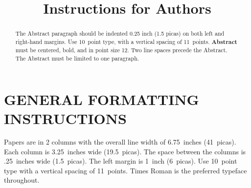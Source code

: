 

\title{Instructions for Authors}

\author{} %

%



\maketitle

\begin{abstract}
The Abstract paragraph should be indented 0.25 inch (1.5 picas) on
both left and right-hand margins.  Use 10~point type, with a vertical
spacing of 11~points.  {\bf Abstract} must be centered, bold, and in
point size 12. Two line spaces precede the Abstract. The Abstract must
be limited to one paragraph.
\end{abstract}

\section{GENERAL FORMATTING INSTRUCTIONS}

Papers are in 2 columns with the overall line width of 6.75~inches
(41~picas).  Each column is 3.25~inches wide (19.5~picas).  The space
between the columns is .25~inches wide (1.5~picas).  The left margin
is 1~inch (6~picas).  Use 10~point type with a vertical spacing of
11~points.  Times Roman is the preferred typeface throughout.

